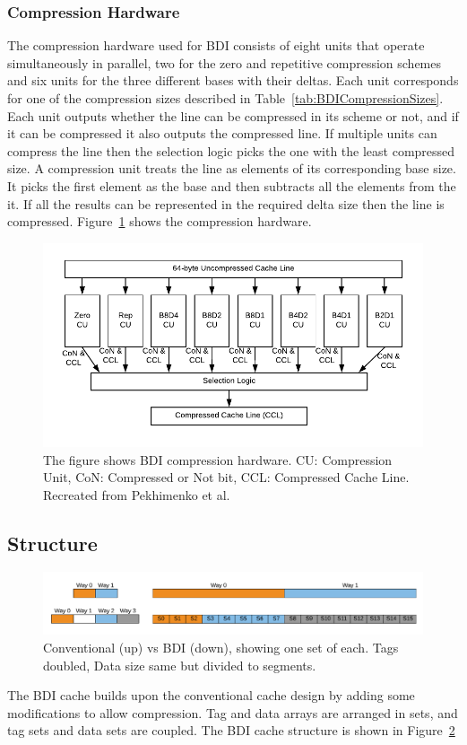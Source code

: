 \subsubsection{Compression Hardware}
\label{sssec:BDICompressionHardware}
The compression hardware used for BDI consists of eight units that operate simultaneously in parallel, two for the zero and repetitive compression schemes and six units for the three different bases with their deltas. Each unit corresponds for one of the compression sizes described in Table~\ref{tab:BDICompressionSizes}. Each unit outputs whether the line can be compressed in its scheme or not, and if it can be compressed it also outputs the compressed line. If multiple units can compress the line then the selection logic picks the one with the least compressed size.
A compression unit treats the line as elements of its corresponding base size. It picks the first element as the base and then subtracts all the elements from the it. If all the results can be represented in the required delta size then the line is compressed. Figure~\ref{fig:BDIHardware} shows the compression hardware.
\begin{figure}
    \includegraphics[width=\textwidth]{BDIHardware.pdf}
    \caption[BDI Compression Hardware]{The figure shows BDI compression hardware. CU: Compression Unit, CoN: Compressed or Not bit, CCL: Compressed Cache Line. Recreated from Pekhimenko et al.\protect\cite{bdi}}
    \label{fig:BDIHardware}
\end{figure}

\subsection{Structure}
\label{ssec:BDIStructure}
\begin{figure}
    \includegraphics[width=\textwidth]{BDI.pdf}
    \caption[BDI Cache]{Conventional (up) vs BDI (down), showing one set of each. Tags doubled, Data size same but divided to segments.}
    \label{fig:BDI}
\end{figure}
The BDI cache builds upon the conventional cache design by adding some modifications to allow compression. Tag and data arrays are arranged in sets, and tag sets and data sets are coupled. The BDI cache structure is shown in Figure~\ref{fig:BDI}
